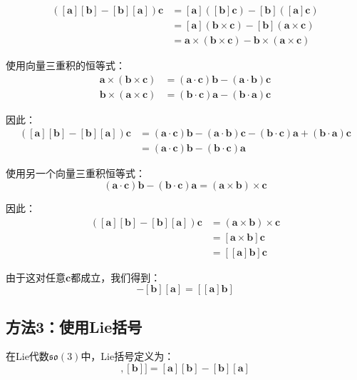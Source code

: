 \documentclass[12pt,a4paper]{article}
\begin{document}
\begin{align}
([\bm{a}][\bm{b}] - [\bm{b}][\bm{a}])\bm{c} &= [\bm{a}]([\bm{b}]\bm{c}) - [\bm{b}]([\bm{a}]\bm{c}) \\
&= [\bm{a}](\bm{b} \times \bm{c}) - [\bm{b}](\bm{a} \times \bm{c}) \\
&= \bm{a} \times (\bm{b} \times \bm{c}) - \bm{b} \times (\bm{a} \times \bm{c})
\end{align}

使用向量三重积的恒等式：
\begin{align}
\bm{a} \times (\bm{b} \times \bm{c}) &= (\bm{a} \cdot \bm{c})\bm{b} - (\bm{a} \cdot \bm{b})\bm{c} \\
\bm{b} \times (\bm{a} \times \bm{c}) &= (\bm{b} \cdot \bm{c})\bm{a} - (\bm{b} \cdot \bm{a})\bm{c}
\end{align}

因此：
\begin{align}
([\bm{a}][\bm{b}] - [\bm{b}][\bm{a}])\bm{c} &= (\bm{a} \cdot \bm{c})\bm{b} - (\bm{a} \cdot \bm{b})\bm{c} - (\bm{b} \cdot \bm{c})\bm{a} + (\bm{b} \cdot \bm{a})\bm{c} \\
&= (\bm{a} \cdot \bm{c})\bm{b} - (\bm{b} \cdot \bm{c})\bm{a}
\end{align}

使用另一个向量三重积恒等式：
\begin{equation}
(\bm{a} \cdot \bm{c})\bm{b} - (\bm{b} \cdot \bm{c})\bm{a} = (\bm{a} \times \bm{b}) \times \bm{c}
\end{equation}

因此：
\begin{align}
([\bm{a}][\bm{b}] - [\bm{b}][\bm{a}])\bm{c} &= (\bm{a} \times \bm{b}) \times \bm{c} \\
&= [\bm{a} \times \bm{b}]\bm{c} \\
&= [[\bm{a}]\bm{b}]\bm{c}
\end{align}

由于这对任意$\bm{c}$都成立，我们得到：
\begin{equation}
[\bm{a}][\bm{b}] - [\bm{b}][\bm{a}] = [[\bm{a}]\bm{b}]
\end{equation}

\subsection{方法3：使用Lie括号}

在Lie代数$\mathfrak{so}(3)$中，Lie括号定义为：
\begin{equation}
[[\bm{a}], [\bm{b}]] = [\bm{a}][\bm{b}] - [\bm{b}][\bm{a}]
\end{equation}
\end{document}
